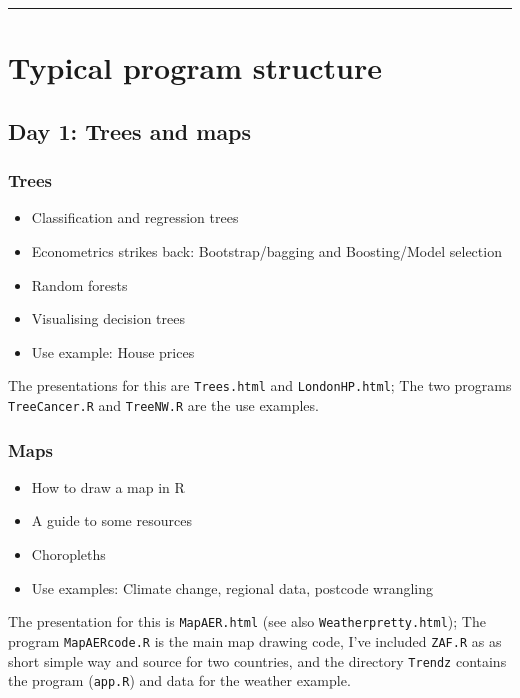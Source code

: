 \documentclass[
  letterpaper,
]{book}
\providecommand{\tightlist}{%
  \setlength{\itemsep}{0pt}\setlength{\parskip}{0pt}}\usepackage{longtable,booktabs,array}
\begin{document}
\begin{center}\rule{0.5\linewidth}{0.5pt}\end{center}

\hypertarget{typical-program-structure}{%
\section{Typical program structure}\label{typical-program-structure}}

\hypertarget{day-1-trees-and-maps}{%
\subsection{Day 1: Trees and maps}\label{day-1-trees-and-maps}}

\hypertarget{trees}{%
\subsubsection{Trees}\label{trees}}

\begin{itemize}
\tightlist
\item
  Classification and regression trees
\item
  Econometrics strikes back: Bootstrap/bagging and Boosting/Model
  selection
\item
  Random forests
\item
  Visualising decision trees
\item
  Use example: House prices
\end{itemize}

The presentations for this are \texttt{Trees.html} and
\texttt{LondonHP.html}; The two programs \texttt{TreeCancer.R} and
\texttt{TreeNW.R} are the use examples.

\hypertarget{maps}{%
\subsubsection{Maps}\label{maps}}

\begin{itemize}
\tightlist
\item
  How to draw a map in R
\item
  A guide to some resources
\item
  Choropleths
\item
  Use examples: Climate change, regional data, postcode wrangling
\end{itemize}

The presentation for this is \texttt{MapAER.html} (see also
\texttt{Weatherpretty.html}); The program \texttt{MapAERcode.R} is the
main map drawing code, I've included \texttt{ZAF.R} as as short simple
way and source for two countries, and the directory \texttt{Trendz}
contains the program (\texttt{app.R}) and data for the weather example.
\end{document}
